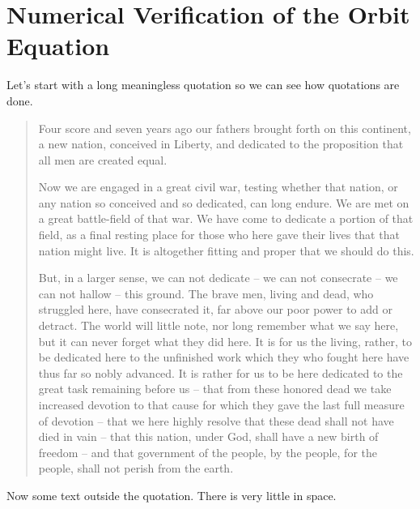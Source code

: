 \chapter{Numerical Verification of the Orbit Equation}
Let's start with a long meaningless quotation so we can see how quotations are done.

\begin{quotation}
Four score and seven years ago our fathers brought forth on this continent, a new nation, conceived in Liberty, and dedicated to the proposition that all men are created equal.

Now we are engaged in a great civil war, testing whether that nation, or any nation so conceived and so dedicated, can long endure. We are met on a great battle-field of that war. We have come to dedicate a portion of that field, as a final resting place for those who here gave their lives that that nation might live. It is altogether fitting and proper that we should do this.

But, in a larger sense, we can not dedicate -- we can not consecrate -- we can not hallow -- this ground. The brave men, living and dead, who struggled here, have consecrated it, far above our poor power to add or detract. The world will little note, nor long remember what we say here, but it can never forget what they did here. It is for us the living, rather, to be dedicated here to the unfinished work which they who fought here have thus far so nobly advanced. It is rather for us to be here dedicated to the great task remaining before us -- that from these honored dead we take increased devotion to that cause for which they gave the last full measure of devotion -- that we here highly resolve that these dead shall not have died in vain -- that this nation, under God, shall have a new birth of freedom -- and that government of the people, by the people, for the people, shall not perish from the earth.
\end{quotation}
Now some text outside the quotation. There is very little  in space.  

